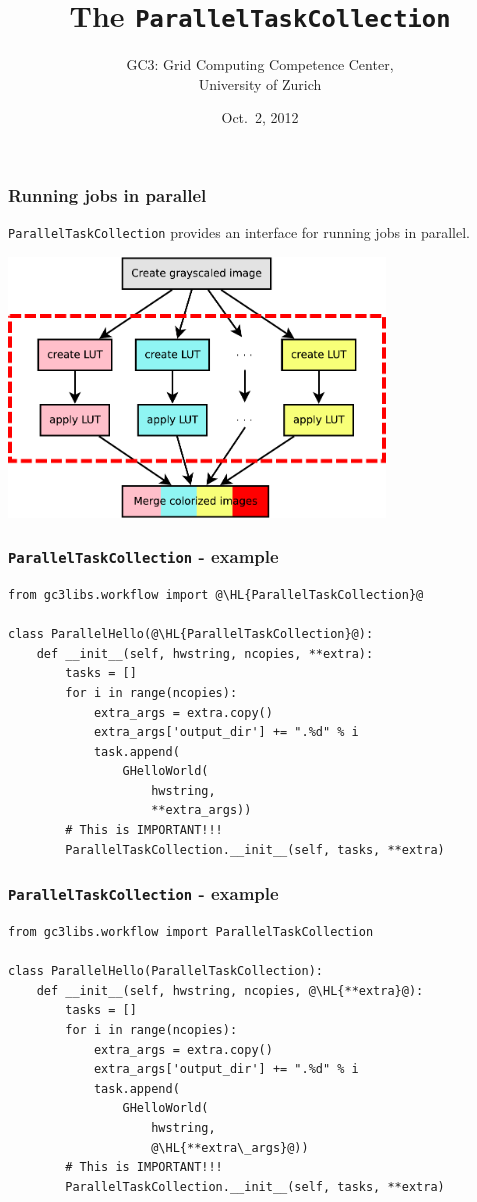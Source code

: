 \documentclass[english,serif,mathserif,xcolor=pdftex,dvipsnames,table]{beamer}
\title{%
  The \texttt{ParallelTaskCollection}
}
\author[Antonio Messina]{%
  GC3: Grid Computing Competence Center, \\
  University of Zurich
}
\date{Oct.~2, 2012}
\begin{document}
\maketitle


\begin{frame}[fragile]
  \frametitle{Running jobs in parallel}

  \texttt{ParallelTaskCollection} provides an interface for
  running jobs in parallel.

  \+
  \begin{center}
    \includegraphics[width=0.75\textwidth]{fig/warholize-wkf2}
  \end{center}
\end{frame}


\begin{frame}[fragile]
  \frametitle{\texttt{ParallelTaskCollection} - example}
  \begin{lstlisting}[basicstyle=\tt\scriptsize]
from gc3libs.workflow import @\HL{ParallelTaskCollection}@

class ParallelHello(@\HL{ParallelTaskCollection}@):
    def __init__(self, hwstring, ncopies, **extra):
        tasks = []
        for i in range(ncopies):
            extra_args = extra.copy()
            extra_args['output_dir'] += ".%d" % i
            task.append(
                GHelloWorld(
                    hwstring,
                    **extra_args))
        # This is IMPORTANT!!!
        ParallelTaskCollection.__init__(self, tasks, **extra)
  \end{lstlisting}
\end{frame}



\begin{frame}[fragile]
  \frametitle{\texttt{ParallelTaskCollection} - example}
  \begin{lstlisting}[basicstyle=\tt\scriptsize]
from gc3libs.workflow import ParallelTaskCollection

class ParallelHello(ParallelTaskCollection):
    def __init__(self, hwstring, ncopies, @\HL{**extra}@):
        tasks = []
        for i in range(ncopies):
            extra_args = extra.copy()
            extra_args['output_dir'] += ".%d" % i
            task.append(
                GHelloWorld(
                    hwstring,
                    @\HL{**extra\_args}@))
        # This is IMPORTANT!!!
        ParallelTaskCollection.__init__(self, tasks, **extra)
  \end{lstlisting}
\end{frame}
\end{document}

